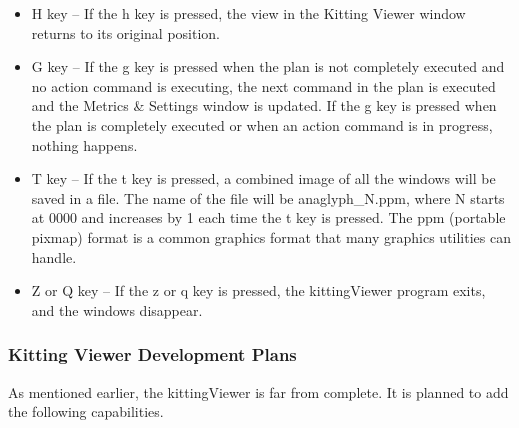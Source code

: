 \begin{itemize}
\item H key -- If the h key is pressed, the view in the Kitting Viewer
  window returns to its original position.\\

\item G key -- If the g key is pressed when the plan is not completely
  executed and no action command is executing, the next command in the plan
  is executed and the Metrics \& Settings window is updated. If the g key
  is pressed when the plan is completely executed or when an action command
  is in progress, nothing happens.\\

\item T key -- If the t key is pressed, a combined image of all the windows
  will be saved in a file. The name of the file will be anaglyph\_N.ppm,
  where N starts at 0000 and increases by 1 each time the t key is
  pressed. The ppm (portable pixmap) format is a common graphics format
  that many graphics utilities can handle.\\

\item Z or Q key -- If the z or q key is pressed, the kittingViewer program
  exits, and the windows disappear.\\

\end{itemize}

\subsubsection{Kitting Viewer Development Plans}

As mentioned earlier, the kittingViewer is far from complete. It is
planned to add the following capabilities.

